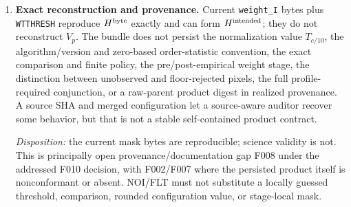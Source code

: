 \documentclass[11pt]{article}
\newcommand{\code}[1]{\nolinkurl{#1}}
\begin{document}
\begin{enumerate}[leftmargin=*,label=\arabic*.]
\emph{Disposition:} not a documentation-only issue: the persisted predicate is
wrong in allowed states (F002), while the absent products/metadata are F007
under the accepted F010 hierarchy.  NOI and FLT must treat raw science
validity as unavailable for new claims until the repaired/versioned product is
accepted.

\item \textbf{Exact reconstruction and provenance.}
Current \code{weight_I} bytes plus \code{WTTHRESH} reproduce
\(H^{\rm byte}\) exactly and can form \(H^{\rm intended}\); they do not
reconstruct \(V_p\).  The bundle does not persist the normalization value
\(T_{c/10}\), the algorithm/version and zero-based order-statistic convention,
the exact comparison and finite policy, the pre/post-empirical weight stage,
the distinction between unobserved and floor-rejected pixels, the full
profile-required conjunction, or a raw-parent product digest in realized
provenance.  A source SHA and merged configuration let a source-aware auditor
recover some behavior, but that is not a stable self-contained product
contract.

\emph{Disposition:} the current mask bytes are reproducible; science validity
is not.  This is principally open provenance/documentation gap F008 under the
addressed F010 decision, with F002/F007 where the persisted product itself is
nonconformant or absent.  NOI/FLT must not substitute a locally guessed
threshold, comparison, rounded configuration value, or stage-local mask.


\end{enumerate}
\end{document}
